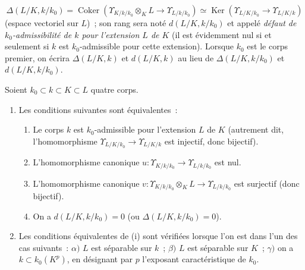 \begin{env}[21.6.1.2]
\label{0.21.6.1.2-fr}
\[
\Delta(L/K,k/k_0)=\operatorname{Coker}
(\Upsilon_{K/k/k_0}\otimes_KL\to\Upsilon_{L/k/k_0})
\simeq\operatorname{Ker}(\Upsilon_{L/K/k_0}\to\Upsilon_{L/K/k})
\]
(espace vectoriel sur $L$)~; son rang sera noté $d(L/K,k/k_0)$ et appelé
\emph{défaut de $k_0$-admissibilité de $k$ pour l'extension $L$ de $K$}
(il est évidemment nul si et seulement si $k$ est $k_0$-admissible pour cette
extension). Lorsque $k_0$ est le corps premier, on écrira
$\Delta(L/K,k)$ et $d(L/K,k)$ au lieu de $\Delta(L/K,k/k_0)$ et
$d(L/K,k/k_0)$.
\end{env}

\begin{proposition}[21.6.2]
\label{0.21.6.2-fr}
Soient $k_0\subset k\subset K\subset L$ quatre corps.
\begin{enumerate}
  \item[\rm (i)] Les conditions suivantes sont équivalentes~:
  \begin{enumerate}
    \item[\rm a)] Le corps $k$ est $k_0$-admissible pour l'extension $L$ de $K$
    (autrement dit, l'homomorphisme $\Upsilon_{L/K/k_0}\to
    \Upsilon_{L/K/k}$ est injectif, donc bijectif).
    \item[\rm b)] L'homomorphisme canonique
    $u:\Upsilon_{K/k/k_0}\to\Upsilon_{L/k/k_0}$ est nul.
    \item[\rm c)] L'homomorphisme canonique
    $v:\Upsilon_{K/k/k_0}\otimes_KL\to\Upsilon_{L/k/k_0}$ est surjectif
    (donc bijectif).
    \item[\rm d)] On a $d(L/K,k/k_0)=0$ (ou
    $\Delta(L/K,k/k_0)=0$).
  \end{enumerate}
  \item[\rm (ii)] Les conditions équivalentes de (i) sont vérifiées lorsque
  l'on est dans l'un des cas suivants~: $\alpha)$ $L$ est séparable sur $k$~;
  $\beta)$ $L$ est séparable sur $K$~; $\gamma)$ on a
  $k\subset k_0(K^p)$, en désignant par $p$ l'exposant caractéristique de $k_0$.
\end{enumerate}
\end{proposition}


